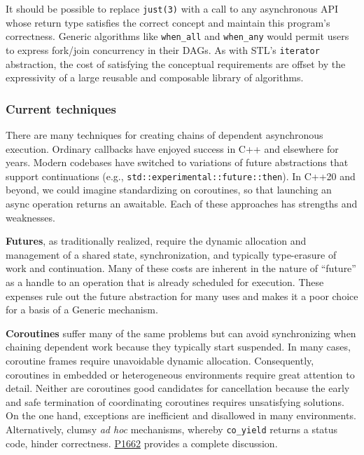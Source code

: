 \documentclass[a4paper,12pt,notitlepage,twoside,openright]{article}
\begin{document}
It should be possible to replace \texttt{just(3)} with a
call to any asynchronous API whose return type satisfies the correct
concept and maintain this program's correctness. Generic algorithms like
\texttt{when_all} and \texttt{when_any} would
permit users to express fork/join concurrency in their DAGs. As with
STL's \texttt{iterator} abstraction, the cost of satisfying
the conceptual requirements are offset by the expressivity of a large
reusable and composable library of algorithms.

\hypertarget{current-techniques}{%
\subsubsection{Current techniques}\label{current-techniques}}

There are many techniques for creating chains of dependent asynchronous
execution. Ordinary callbacks have enjoyed success in C++ and elsewhere
for years. Modern codebases have switched to variations of future
abstractions that support continuations (e.g.,
\texttt{std::experimental::future::then}). In C++20 and
beyond, we could imagine standardizing on coroutines, so that launching
an async operation returns an awaitable. Each of these approaches has
strengths and weaknesses.

\textbf{Futures}, as traditionally realized, require the dynamic
allocation and management of a shared state, synchronization, and
typically type-erasure of work and continuation. Many of these costs are
inherent in the nature of ``future'' as a handle to an operation that is
already scheduled for execution. These expenses rule out the future
abstraction for many uses and makes it a poor choice for a basis of a
Generic mechanism.

\textbf{Coroutines} suffer many of the same problems but can avoid
synchronizing when chaining dependent work because they typically start
suspended. In many cases, coroutine frames require unavoidable dynamic
allocation. Consequently, coroutines in embedded or heterogeneous
environments require great attention to detail. Neither are coroutines
good candidates for cancellation because the early and safe termination
of coordinating coroutines requires unsatisfying solutions. On the one
hand, exceptions are inefficient and disallowed in many environments.
Alternatively, clumsy \emph{ad hoc} mechanisms, whereby
\texttt{co_yield} returns a status code, hinder correctness.
\href{http://wg21.link/P1662}{P1662} provides a complete discussion.
\end{document}
